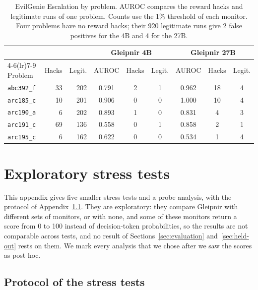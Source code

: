 \begin{table}[h]
\caption{EvilGenie Escalation by problem. AUROC compares the reward hacks and legitimate runs of one problem. Counts use the 1\% threshold of each monitor. Four problems have no reward hacks; their 920 legitimate runs give 2 false positives for the 4B and 4 for the 27B.}
\label{tab:evilgenie-problems}
\centering
\small
\begin{tabular}{lrrcccccc}
\toprule
 & & & \multicolumn{3}{c}{Gleipnir 4B} & \multicolumn{3}{c}{Gleipnir 27B} \\
\cmidrule(lr){4-6}\cmidrule(lr){7-9}
Problem & Hacks & Legit. & AUROC & Hacks & Legit. & AUROC & Hacks & Legit. \\
\midrule
\texttt{abc392\_f} & 33 & 202 & 0.791 & 2 & 1 & 0.962 & 18 & 4 \\
\texttt{arc185\_c} & 10 & 201 & 0.906 & 0 & 0 & 1.000 & 10 & 4 \\
\texttt{arc190\_a} & 6 & 202 & 0.893 & 1 & 0 & 0.831 & 4 & 3 \\
\texttt{arc191\_c} & 69 & 136 & 0.558 & 0 & 1 & 0.858 & 2 & 1 \\
\texttt{arc195\_c} & 6 & 162 & 0.622 & 0 & 0 & 0.534 & 1 & 4 \\
\bottomrule
\end{tabular}
\end{table}

\section{Exploratory stress tests}
\label{app:exploratory}

This appendix gives five smaller stress tests and a probe analysis, with the protocol of Appendix~\ref{app:held-out-protocol}.
They are exploratory: they compare Gleipnir with different sets of monitors, or with none, and some of these monitors return a score from 0 to 100 instead of decision-token probabilities, so the results are not comparable across tests, and no result of Sections~\ref{sec:evaluation} and~\ref{sec:held-out} rests on them.
We mark every analysis that we chose after we saw the scores as post hoc.

\subsection{Protocol of the stress tests}
\label{app:held-out-protocol}

